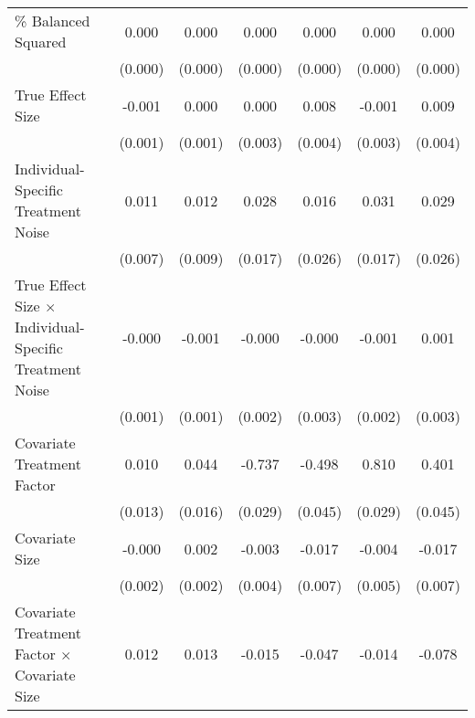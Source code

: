 \begin{table}[htbp]
\begin{tabular}{l*{6}{c}}
\% Balanced Squared &       0.000\sym{***}&       0.000\sym{***}&       0.000\sym{***}&       0.000\sym{***}&       0.000\sym{***}&       0.000\sym{***}\\
                    &     (0.000)         &     (0.000)         &     (0.000)         &     (0.000)         &     (0.000)         &     (0.000)         \\
True Effect Size    &      -0.001         &       0.000         &       0.000         &       0.008\sym{*}  &      -0.001         &       0.009\sym{*}  \\
                    &     (0.001)         &     (0.001)         &     (0.003)         &     (0.004)         &     (0.003)         &     (0.004)         \\
Individual-Specific Treatment Noise&       0.011         &       0.012         &       0.028         &       0.016         &       0.031         &       0.029         \\
                    &     (0.007)         &     (0.009)         &     (0.017)         &     (0.026)         &     (0.017)         &     (0.026)         \\
True Effect Size $\times$ Individual-Specific Treatment Noise&      -0.000         &      -0.001         &      -0.000         &      -0.000         &      -0.001         &       0.001         \\
                    &     (0.001)         &     (0.001)         &     (0.002)         &     (0.003)         &     (0.002)         &     (0.003)         \\
Covariate Treatment Factor&       0.010         &       0.044\sym{**} &      -0.737\sym{***}&      -0.498\sym{***}&       0.810\sym{***}&       0.401\sym{***}\\
                    &     (0.013)         &     (0.016)         &     (0.029)         &     (0.045)         &     (0.029)         &     (0.045)         \\
Covariate Size      &      -0.000         &       0.002         &      -0.003         &      -0.017\sym{*}  &      -0.004         &      -0.017\sym{*}  \\
                    &     (0.002)         &     (0.002)         &     (0.004)         &     (0.007)         &     (0.005)         &     (0.007)         \\
Covariate Treatment Factor $\times$ Covariate Size&       0.012\sym{**} &       0.013\sym{*}  &      -0.015         &      -0.047\sym{**} &      -0.014         &      -0.078\sym{***}\\

\end{tabular}
\end{table}
